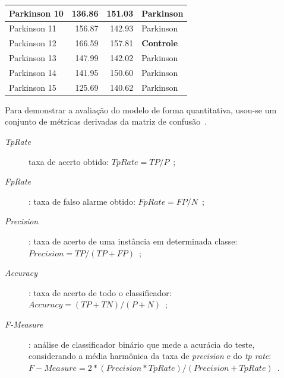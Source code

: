 \begin{table}[!htp]
\begin{tabular}{|l|l|l|l|}
Parkinson 10         & \multicolumn{1}{r|}{136.86}                                                          & \multicolumn{1}{r|}{151.03}                                                          & Parkinson                                                            \\ \hline
Parkinson 11         & \multicolumn{1}{r|}{156.87}                                                          & \multicolumn{1}{r|}{142.93}                                                          & Parkinson                                                            \\ \hline
Parkinson 12         & \multicolumn{1}{r|}{166.59}                                                          & \multicolumn{1}{r|}{157.81}                                                          & \textbf{Controle}                                                            \\ \hline
Parkinson 13         & \multicolumn{1}{r|}{147.99}                                                          & \multicolumn{1}{r|}{142.02}                                                          & Parkinson                                                            \\ \hline
Parkinson 14         & \multicolumn{1}{r|}{141.95}                                                          & \multicolumn{1}{r|}{150.60}                                                          & Parkinson                                                            \\ \hline
Parkinson 15         & \multicolumn{1}{r|}{125.69}                                                          & \multicolumn{1}{r|}{140.62}                                                          & Parkinson                                                            
\\ \hline
\end{tabular}
\end{table}

Para demonstrar a avaliação do modelo de forma quantitativa, usou-se um conjunto de métricas derivadas da matriz de confusão~\cite{kantardzic2011data}.
 \begin{description}
 	\item [\textit{TpRate}] taxa de acerto obtido: $ TpRate = TP/P $\ ;
 	\item [\textit{FpRate}]: taxa de falso alarme obtido: $ FpRate = FP/N $\ ;
 	\item [\textit{Precision}]: taxa de acerto de uma instância em determinada classe: $ Precision =  TP/(TP +FP) $\ ;
 	\item [\textit{Accuracy}]: taxa de acerto de todo o classificador: $ Accuracy = (TP+TN)/(P+N) $\ ;
 	\item [\textit{F-Measure}]: análise de classificador binário que mede a acurácia do teste, considerando a média harmônica da taxa de \textit{precision} e do \textit{tp rate}: $ F-Measure = 2 * (Precision * TpRate)/(Precision + TpRate) $\ .
 \end{description}




